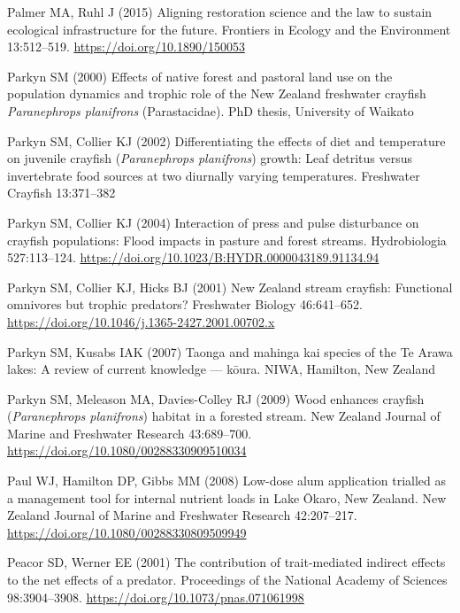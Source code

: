\documentclass[
  12pt,
  a4paper,
  oneside]{scrbook}
\newlength{\cslhangindent}
\newenvironment{CSLReferences}[2] %
 {\begin{list}{}{%
  \setlength{\itemindent}{0pt}
  \setlength{\leftmargin}{0pt}
  \setlength{\parsep}{0pt}
  \ifodd #1
   \setlength{\leftmargin}{\cslhangindent}
   \setlength{\itemindent}{-1\cslhangindent}
  \fi
  \setlength{\itemsep}{#2\baselineskip}}}
 {\end{list}}
\renewenvironment{CSLReferences}[2]
   {\begin{list}{}{%
    \setlength{\itemindent}{0pt}
    \setlength{\leftmargin}{0pt}
    \setlength{\parsep}{0pt}
    \ifodd #1
     \setlength{\leftmargin}{\cslhangindent}
     \setlength{\itemindent}{-1\cslhangindent}
    \fi
    \setlength{\itemsep}{0.3\baselineskip}}}
   {\end{list}}%
\begin{document}
\begin{CSLReferences}{1}{1}
Palmer MA, Ruhl J (2015) Aligning restoration science and the law to
sustain ecological infrastructure for the future. Frontiers in Ecology
and the Environment 13:512--519. \url{https://doi.org/10.1890/150053}

Parkyn SM (2000) Effects of native forest and pastoral land use on the
population dynamics and trophic role of the {New Zealand} freshwater
crayfish {\emph{Paranephrops planifrons}} ({Parastacidae}). PhD thesis,
University of Waikato

Parkyn SM, Collier KJ (2002) Differentiating the effects of diet and
temperature on juvenile crayfish ({\emph{Paranephrops planifrons}})
growth: Leaf detritus versus invertebrate food sources at two diurnally
varying temperatures. Freshwater Crayfish 13:371--382

Parkyn SM, Collier KJ (2004) Interaction of press and pulse disturbance
on crayfish populations: Flood impacts in pasture and forest streams.
Hydrobiologia 527:113--124.
\url{https://doi.org/10.1023/B:HYDR.0000043189.91134.94}

Parkyn SM, Collier KJ, Hicks BJ (2001) {New Zealand} stream crayfish:
Functional omnivores but trophic predators? Freshwater Biology
46:641--652. \url{https://doi.org/10.1046/j.1365-2427.2001.00702.x}

Parkyn SM, Kusabs IAK (2007) Taonga and mahinga kai species of the {Te
Arawa} lakes: A review of current knowledge --- kōura. NIWA, Hamilton,
New Zealand

Parkyn SM, Meleason MA, Davies-Colley RJ (2009) Wood enhances crayfish
({\emph{Paranephrops planifrons}}) habitat in a forested stream. New
Zealand Journal of Marine and Freshwater Research 43:689--700.
\url{https://doi.org/10.1080/00288330909510034}

Paul WJ, Hamilton DP, Gibbs MM (2008) Low-dose alum application trialled
as a management tool for internal nutrient loads in {Lake Ōkaro}, {New
Zealand}. New Zealand Journal of Marine and Freshwater Research
42:207--217. \url{https://doi.org/10.1080/00288330809509949}

Peacor SD, Werner EE (2001) The contribution of trait-mediated indirect
effects to the net effects of a predator. Proceedings of the National
Academy of Sciences 98:3904--3908.
\url{https://doi.org/10.1073/pnas.071061998}


\end{CSLReferences}
\end{document}
